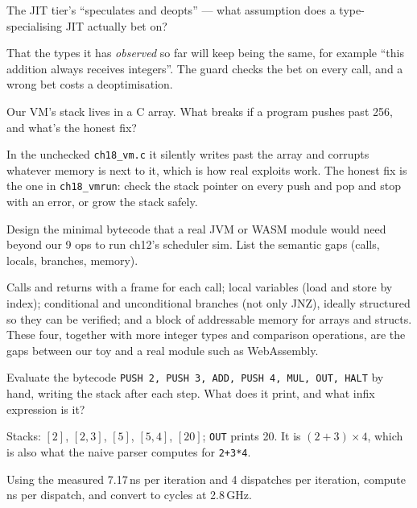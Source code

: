 \begin{exercise}[medium]
The JIT tier's ``speculates and deopts'' --- what assumption does
a type-specialising JIT actually bet on?
\end{exercise}
\begin{solution}
That the types it has \emph{observed} so far will keep being the same,
for example ``this addition always receives integers''. The guard checks the bet
on every call, and a wrong bet costs a deoptimisation.
\end{solution}
\begin{exercise}[medium]
Our VM's stack lives in a C array. What breaks if a program
pushes past 256, and what's the honest fix?
\end{exercise}
\begin{solution}
In the unchecked \texttt{ch18\_vm.c} it silently writes past the array and
corrupts whatever memory is next to it, which is how real exploits work.
The honest fix is the one in \texttt{ch18\_vmrun}: check the stack pointer on
every push and pop and stop with an error, or grow the stack safely.
\end{solution}
\begin{exercise}[hard]
Design the minimal bytecode that a real JVM or WASM module would
need beyond our 9 ops to run ch12's scheduler sim. List the
semantic gaps (calls, locals, branches, memory).
\end{exercise}
\begin{solution}
Calls and returns with a frame for each call; local variables (load and store
by index); conditional and unconditional branches (not only JNZ), ideally structured
so they can be verified; and a block of addressable memory for arrays and structs.
These four, together with more integer types and comparison operations, are the
gaps between our toy and a real module such as WebAssembly.
\end{solution}
\begin{exercise}[easy]
Evaluate the bytecode \texttt{PUSH 2, PUSH 3, ADD, PUSH 4, MUL, OUT, HALT}
by hand, writing the stack after each step. What does it print, and
what infix expression is it?
\end{exercise}
\begin{solution}
Stacks: $[2]$, $[2,3]$, $[5]$, $[5,4]$, $[20]$; \texttt{OUT} prints 20.
It is $(2+3)\times4$, which is also what the naive parser computes for \texttt{2+3*4}.
\end{solution}
\begin{exercise}[medium]
Using the measured 7.17\,ns per iteration and 4 dispatches per
iteration, compute ns per dispatch, and convert to cycles at 2.8\,GHz.
\end{exercise}
